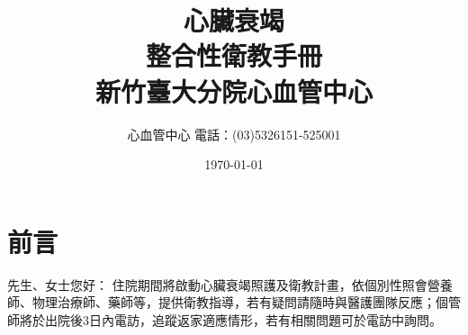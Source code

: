 \documentclass[nols]{tufte-book}
\begin{document}


\title[心血管中心衛教手冊]{
\logos
\textbf{心臟衰竭\\
整合性衛教手冊\\
新竹臺大分院心血管中心}}
\author{心血管中心 電話：(03)5326151-525001}
\date{\today}




\tableofcontents

\onehalfspacing


\chapter*{前言}
先生、女士您好：
住院期間將啟動心臟衰竭照護及衛教計畫，依個別性照會營養師、物理治療師、藥師等，提供衛教指導，若有疑問請隨時與醫護團隊反應；個管師將於出院後3日內電訪，追蹤返家適應情形，若有相關問題可於電訪中詢問。

\thispagestyle{plain}

\setcounter{page}{1}
\end{document}
